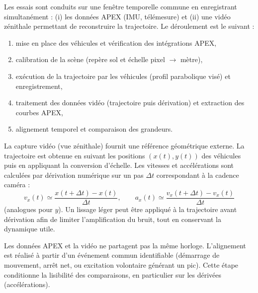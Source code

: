 Les essais sont conduits sur une fenêtre temporelle commune en enregistrant simultanément : (i) les données APEX (\acrshort{IMU},
télémesure) et (ii) une vidéo zénithale permettant de reconstruire la trajectoire. Le déroulement est le suivant :
\begin{enumerate}
    \item mise en place des véhicules et vérification des intégrations APEX,
    \item calibration de la scène (repère sol et échelle pixel $\rightarrow$ mètre),
    \item exécution de la trajectoire par les véhicules (profil parabolique visé) et enregistrement,
    \item traitement des données vidéo (trajectoire puis dérivation) et extraction des courbes APEX,
    \item alignement temporel et comparaison des grandeurs.
\end{enumerate}

La capture vidéo (vue zénithale) fournit une référence géométrique externe. La trajectoire est obtenue en suivant les positions
$(x(t),y(t))$ des véhicules puis en appliquant la conversion d’échelle. Les vitesses et accélérations sont calculées par
dérivation numérique sur un pas $\Delta t$ correspondant à la cadence caméra :
\[
v_x(t) \simeq \frac{x(t+\Delta t)-x(t)}{\Delta t}, \qquad
a_x(t) \simeq \frac{v_x(t+\Delta t)-v_x(t)}{\Delta t}
\]
(analogues pour $y$). Un lissage léger peut être appliqué à la trajectoire avant dérivation afin de limiter l’amplification du
bruit, tout en conservant la dynamique utile.

Les données APEX et la vidéo ne partagent pas la même horloge. L’alignement est réalisé à partir d’un événement commun
identifiable (démarrage de mouvement, arrêt net, ou excitation volontaire générant un pic). Cette étape conditionne la lisibilité
des comparaisons, en particulier sur les dérivées (accélérations).

\newpage

